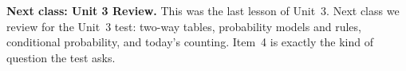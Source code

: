 \documentclass[12pt]{article}
\begin{document}
\boxguard[5]   %
\begin{spiralbox}
\textbf{Next class: Unit 3 Review.} This was the last lesson of Unit~3. Next class we review for
the Unit~3 test: two-way tables, probability models and rules, conditional probability, and
today's counting. Item~4 is exactly the kind of question the test asks.
\end{spiralbox}
\end{document}
